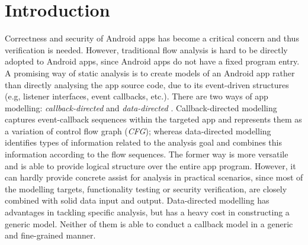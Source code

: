 \section{Introduction}

Correctness and security of Android apps has become a critical concern and thus verification is needed.
%
However, traditional flow analysis \cite{new1976program, new1978dataflow} is hard to be directly adopted to Android apps, since Android apps do not have a fixed program entry. A promising way of static analysis is to create models of an Android app rather than directly analysing the app source code, due to its event-driven structures (e.g, listener interfaces, event callbacks, etc.). There are two ways of app modelling: \textit{callback-directed} \cite{new2013contextual,new2015static} and \textit{data-directed} \cite{new2014flowdroid, new2015DroidSafe}. Callback-directed modelling captures event-callback sequences within the targeted app and represents them as a variation of control flow graph (\textit{CFG}); whereas data-directed modelling identifies types of information related to the analysis goal and combines this information according to the flow sequences. The former way is more versatile and is able to provide logical structure over the entire app program. However, it can hardly provide concrete assist for analysis in practical scenarios, since most of the modelling targets, functionality testing or security verification, are closely combined with solid data input and output.
Data-directed modelling has advantages in tackling specific analysis, but has a heavy cost in constructing a generic model. 
Neither of them is able to conduct a callback model in a generic and fine-grained manner. 

